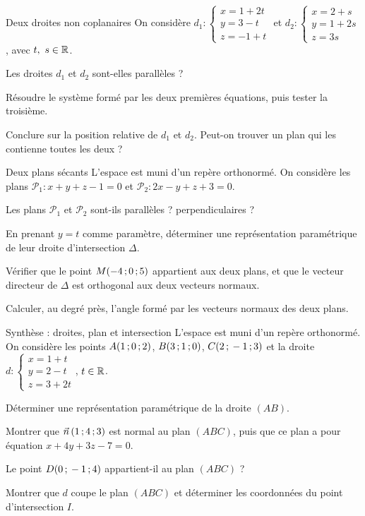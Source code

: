 \begin{exercice}[2]{Deux droites non coplanaires}
On considère $d_1:\begin{cases}x=1+2t\\y=3-t\\z=-1+t\end{cases}$ et $d_2:\begin{cases}x=2+s\\y=1+2s\\z=3s\end{cases}$, avec
$t,\ s\in\mathbb{R}$.
\begin{questions}
  \item Les droites $d_1$ et $d_2$ sont-elles parallèles ?
  \item Résoudre le système formé par les deux premières équations, puis tester la troisième.
  \item Conclure sur la position relative de $d_1$ et $d_2$. Peut-on trouver un plan qui les contienne toutes les deux ?
\end{questions}
\end{exercice}

\begin{exercice}[3]{Deux plans sécants}
L'espace est muni d'un repère orthonormé. On considère les plans $\mathcal{P}_1:x+y+z-1=0$ et $\mathcal{P}_2:2x-y+z+3=0$.
\begin{questions}
  \item Les plans $\mathcal{P}_1$ et $\mathcal{P}_2$ sont-ils parallèles ? perpendiculaires ?
  \item En prenant $y=t$ comme paramètre, déterminer une représentation paramétrique de leur droite d'intersection $\Delta$.
  \item Vérifier que le point $M(-4\,{;}\,0\,{;}\,5)$ appartient aux deux plans, et que le vecteur directeur de $\Delta$ est orthogonal aux
    deux vecteurs normaux.
  \item Calculer, au degré près, l'angle formé par les vecteurs normaux des deux plans.
\end{questions}
\end{exercice}

\begin{exercice}[3]{Synthèse : droites, plan et intersection}
L'espace est muni d'un repère orthonormé. On considère les points $A(1\,{;}\,0\,{;}\,2)$, $B(3\,{;}\,1\,{;}\,0)$, $C(2\,{;}\,-1\,{;}\,3)$ et la droite
$d:\begin{cases}x=1+t\\y=2-t\\z=3+2t\end{cases}$, $t\in\mathbb{R}$.
\begin{questions}
  \item Déterminer une représentation paramétrique de la droite $(AB)$.
  \item Montrer que $\vec n\,(1\,{;}\,4\,{;}\,3)$ est normal au plan $(ABC)$, puis que ce plan a pour équation $x+4y+3z-7=0$.
  \item Le point $D(0\,{;}\,-1\,{;}\,4)$ appartient-il au plan $(ABC)$ ?
  \item Montrer que $d$ coupe le plan $(ABC)$ et déterminer les coordonnées du point d'intersection $I$.
\end{questions}
\end{exercice}

